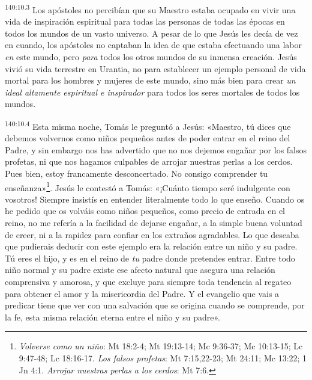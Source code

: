 \par 
\textsuperscript{140:10.3} Los apóstoles no percibían que su Maestro estaba ocupado en vivir una vida de inspiración espiritual para todas las personas de todas las épocas en todos los mundos de un vasto universo. A pesar de lo que Jesús les decía de vez en cuando, los apóstoles no captaban la idea de que estaba efectuando una labor \textit{en} este mundo, pero \textit{para} todos los otros mundos de su inmensa creación. Jesús vivió su vida terrestre en Urantia, no para establecer un ejemplo personal de vida mortal para los hombres y mujeres de este mundo, sino más bien para crear \textit{un ideal altamente espiritual e inspirador} para todos los seres mortales de todos los mundos.

\par 
\textsuperscript{140:10.4} Esta misma noche, Tomás le preguntó a Jesús: «Maestro, tú dices que debemos volvernos como niños pequeños antes de poder entrar en el reino del Padre, y sin embargo nos has advertido que no nos dejemos engañar por los falsos profetas, ni que nos hagamos culpables de arrojar nuestras perlas a los cerdos. Pues bien, estoy francamente desconcertado. No consigo comprender tu enseñanza»\footnote{\textit{Volverse como un niño}: Mt 18:2-4; Mt 19:13-14; Mc 9:36-37; Mc 10:13-15; Lc 9:47-48; Lc 18:16-17. \textit{Los falsos profetas}: Mt 7:15,22-23; Mt 24:11; Mc 13:22; 1 Jn 4:1. \textit{Arrojar nuestras perlas a los cerdos}: Mt 7:6.}. Jesús le contestó a Tomás: «¡Cuánto tiempo seré indulgente con vosotros! Siempre insistís en entender literalmente todo lo que enseño. Cuando os he pedido que os volváis como niños pequeños, como precio de entrada en el reino, no me refería a la facilidad de dejarse engañar, a la simple buena voluntad de creer, ni a la rapidez para confiar en los extraños agradables. Lo que deseaba que pudierais deducir con este ejemplo era la relación entre un niño y su padre. Tú eres el hijo, y es en el reino de \textit{tu} padre donde pretendes entrar. Entre todo niño normal y su padre existe ese afecto natural que asegura una relación comprensiva y amorosa, y que excluye para siempre toda tendencia al regateo para obtener el amor y la misericordia del Padre. Y el evangelio que vais a predicar tiene que ver con una salvación que se origina cuando se comprende, por la fe, esta misma relación eterna entre el niño y su padre».

